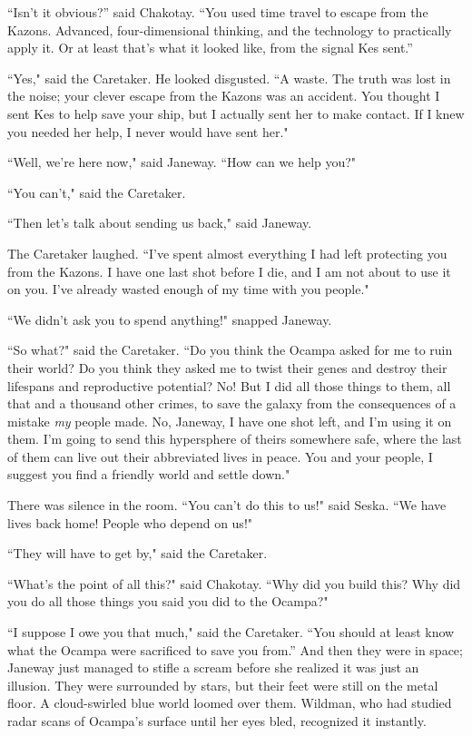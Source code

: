 \documentclass[twoside,letterpaper,12pt]{memoir}
\begin{document}
``Isn’t it obvious?” said Chakotay. ``You used time travel to escape from the Kazons. Advanced, four-dimensional thinking, and the technology to practically apply it. Or at least that’s what it looked like, from the signal Kes sent.” 

``Yes," said the Caretaker. He looked disgusted. ``A waste. The truth was lost in the noise; your clever escape from the Kazons was an accident. You thought I sent Kes to help save your ship, but I actually sent her to make contact. If I knew you needed her help, I never would have sent her." 

``Well, we're here now," said Janeway. ``How can we help you?" 

``You can't," said the Caretaker. 

``Then let's talk about sending us back," said Janeway. 

The Caretaker laughed. ``I’ve spent almost everything I had left protecting you from the Kazons. I have one last shot before I die, and I am not about to use it on you. I've already wasted enough of my time with you people." 

``We didn't ask you to spend anything!" snapped Janeway. 

``So what?" said the Caretaker. ``Do you think the Ocampa asked for me to ruin their world? Do you think they asked me to twist their genes and destroy their lifespans and reproductive potential? No! But I did all those things to them, all that and a thousand other crimes, to save the galaxy from the consequences of a mistake \textit{my} people made. No, Janeway, I have one shot left, and I'm using it on them. I'm going to send this hypersphere of theirs somewhere safe, where the last of them can live out their abbreviated lives in peace. You and your people, I suggest you find a friendly world and settle down." 

There was silence in the room. ``You can't do this to us!" said Seska. ``We have lives back home! People who depend on us!" 

``They will have to get by," said the Caretaker. 

``What's the point of all this?" said Chakotay. ``Why did you build this? Why did you do all those things you said you did to the Ocampa?" 

``I suppose I owe you that much," said the Caretaker. ``You should at least know what the Ocampa were sacrificed to save you from.” And then they were in space; Janeway just managed to stifle a scream before she realized it was just an illusion. They were surrounded by stars, but their feet were still on the metal floor. A cloud-swirled blue world loomed over them. Wildman, who had studied radar scans of Ocampa's surface until her eyes bled, recognized it instantly. 
\end{document}
